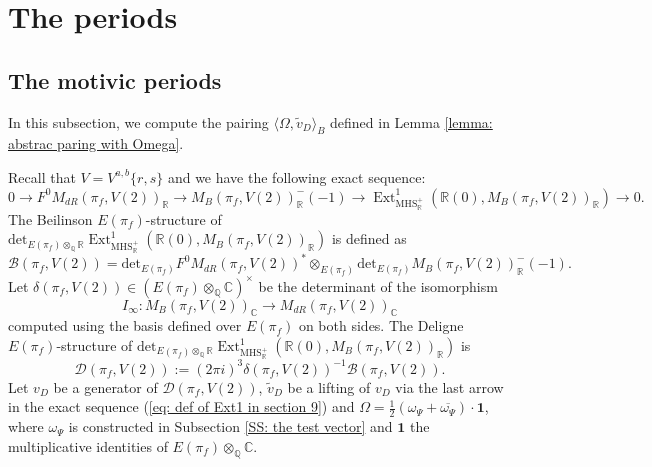 \documentclass[11pt, a4paper]{amsart}
\theoremstyle{plain}
\theoremstyle{definition}
\numberwithin{equation}{section}
\def\CC{\mathbb{C}}
\def\QQ{\mathbb{Q}}
\def\RR{\mathbb{R}}
\DeclareMathOperator{\Ext}{Ext}
\begin{document}
\section{The periods}
\label{Sec: periods}
\subsection{The motivic periods}
\label{SS: motivic periods}
In this subsection, we compute the pairing $\langle \Omega, \tilde{v}_{D} \rangle_{B}$ defined in Lemma \ref{lemma: abstrac paring with Omega}. 

Recall that $V = V^{a, b}\{r, s\}$ and we have the following exact sequence: 
\begin{equation}
\label{eq: def of Ext1 in section 9}
    0 \rightarrow F^{0}M_{dR}(\pi_f, V(2))_{\RR} \rightarrow M_{B}(\pi_f, V(2))^{-}_{\RR}(-1) \rightarrow \Ext^{1}_{\mathrm{MHS_{\RR}^{+}}}(\RR(0), M_{B}(\pi_f, V(2))_{\RR}) \rightarrow 0.
\end{equation}
The Beilinson $E(\pi_f)$-structure of $\mathrm{det}_{E(\pi_f)\otimes_{\QQ}\RR}\Ext^{1}_{\mathrm{MHS_{\RR}^{+}}}(\RR(0), M_{B}(\pi_f, V(2))_{\RR})$ is defined as  
\begin{equation*}
    \mathcal{B}(\pi_f, V(2)) = \mathrm{det}_{E(\pi_f)} F^{0}M_{dR}(\pi_f, V(2))^{*} \otimes_{E(\pi_f)} \mathrm{det}_{E(\pi_f)} M_{B}(\pi_f, V(2))^{-}_{\RR}(-1). 
\end{equation*}
Let $\delta(\pi_f, V(2)) \in (E(\pi_f) \otimes_{\QQ} \CC)^{\times}$ be the determinant of the isomorphism 
\begin{equation*}
I_{\infty} \colon M_{B}(\pi_f, V(2))_{\CC} \rightarrow M_{dR}(\pi_f, V(2))_{\CC}
\end{equation*}
computed using the basis defined over $E(\pi_f)$ on both sides. The Deligne $E(\pi_f)$-structure of $\mathrm{det}_{E(\pi_f)\otimes_{\QQ}\RR}\Ext^{1}_{\mathrm{MHS_{\RR}^{+}}}(\RR(0), M_{B}(\pi_f, V(2))_{\RR})$ is 
\begin{equation*}
    \mathcal{D}(\pi_f, V(2)) := (2\pi i)^{3} \delta(\pi_f, V(2))^{-1} \mathcal{B}(\pi_f, V(2)). 
\end{equation*}
Let $v_D$ be a generator of $\mathcal{D}(\pi_f, V(2))$, $\tilde{v}_{D}$ be a lifting of  $v_{D}$ via the last arrow in the exact sequence (\ref{eq: def of Ext1 in section 9})
and $\Omega = \frac{1}{2} (\omega_{\Psi} + \overline{\omega_{\Psi}}) \cdot \mathbf{1}$, where $\omega_{\Psi}$ is constructed in Subsection \ref{SS: the test vector} and $\mathbf{1}$ the multiplicative identities of $E(\pi_f) \otimes_{\QQ} \CC$. 
\end{document}
